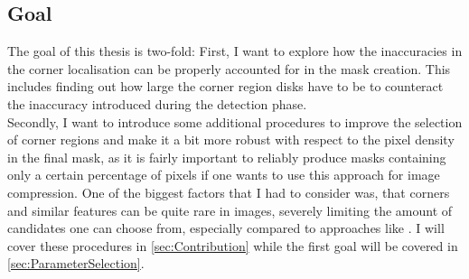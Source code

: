 \subsection*{Goal}\label{ssub:Goal}

The goal of this thesis is two-fold:
First, I want to explore how the inaccuracies in the corner localisation can be properly accounted
for in the mask creation. This includes finding out how large the corner region disks have to be to
counteract the inaccuracy introduced during the detection phase.\\
Secondly, I want to introduce some additional procedures to improve the selection of corner regions
and make it a bit more robust with respect to the pixel density in the final mask, as it is fairly
important to reliably produce masks containing only a certain percentage of pixels if one wants to
use this approach for image compression.
One of the biggest factors that I had to consider was, that corners and similar features can be quite 
rare in images, severely limiting the amount of candidates one can choose from, especially compared to
approaches like \cite{schmaltz09, hoeltgen12}. 
I will cover these procedures in \ref{sec:Contribution} while the first goal will be covered in
\ref{sec:ParameterSelection}.
